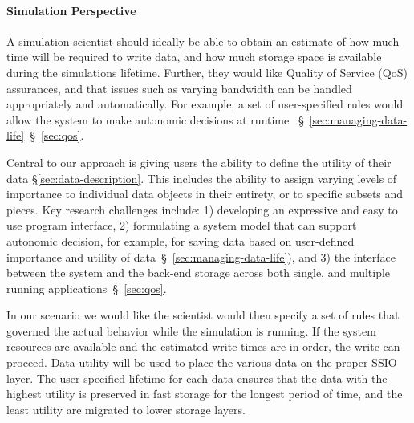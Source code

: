 \paragraph{Simulation Perspective}
\label{subsec:sim-perspective}
A simulation scientist should ideally be able to
obtain an estimate of how much time will be required to write data,
and how much storage space is available during the simulations lifetime.
Further, they would like Quality of Service (QoS) assurances, and that
issues such as varying bandwidth can be handled appropriately and 
automatically. For example, a set of user-specified rules would allow 
the system to make autonomic decisions at runtime
~\S~\ref{sec:managing-data-life}~\S~\ref{sec:qos}.
%

Central to our approach is giving users the ability to define the utility of their data    
 \S\ref{sec:data-description}.
This includes the ability to assign varying levels of importance to individual data objects in their entirety, or to specific
subsets and pieces.
Key research challenges include: 1) developing an expressive and easy to use program interface, 2) formulating a system model that can support 
autonomic decision, for example, for saving data based on user-defined importance and utility of data~\S~\ref{sec:managing-data-life}),
 and 3) the interface between the system and the back-end storage across both single, and multiple running applications~\S~\ref{sec:qos}.

  In our  scenario we would like the scientist would then specify a set of rules that governed the actual behavior while the simulation is running.
If the system resources are available and the estimated write times are in order, the write can proceed.
Data  utility will be used to place the various data on the proper SSIO layer.
The user specified lifetime for each data ensures that the data with the highest utility is preserved in fast storage
for the longest period of time, and the least utility are migrated to lower storage  layers.
%

